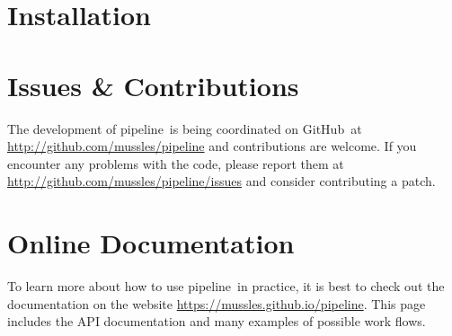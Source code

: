 \documentclass[12pt,preprint]{aastex}
\newcommand{\project}[1]{{\sffamily #1}}
\newcommand{\github}{\project{GitHub}}
\newcommand{\thisplain}{pipeline}
\newcommand{\this}{\project{\thisplain}}
\newcommand{\sectlabel}[1]{\label{sect:#1}}
\begin{document}
\clearpage
\appendix
\section{Installation}\sectlabel{install}

\section{Issues \& Contributions}

The development of \this\ is being coordinated on \github\ at
\url{http://github.com/mussles/pipeline} and contributions are welcome. If you
encounter any problems with the code, please report them at
\url{http://github.com/mussles/pipeline/issues} and consider
contributing a patch.

\section{Online Documentation}

To learn more about how to use \this\ in practice, it is best to check out the
documentation on the website \url{https://mussles.github.io/pipeline}. This page includes
the API documentation and many examples of possible work flows.
\end{document}
